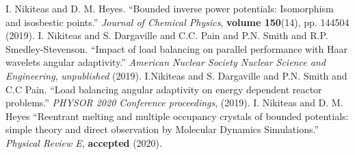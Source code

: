 \begingroup
\renewcommand{\section}[2]{}%
\begin{thebibliography}{}%
    I. Nikiteas and D. M. Heyes.
    ``Bounded inverse power potentials: Isomorphism and isosbestic points.''\newline
    \textit{Journal of Chemical Physics}, \textbf{volume 150}(14), pp. 144504 (2019).
    \newline \newline
    I. Nikiteas and S. Dargaville and C.C. Pain and P.N. Smith and R.P. Smedley-Stevenson.
    ``Impact of load balancing on parallel performance with Haar wavelets angular adaptivity.''
    \textit{American Nuclear Society Nuclear Science and Engineering}, \textit{unpublished} (2019).
    \newline \newline
    I.Nikiteas and S. Dargaville and P.N. Smith and C.C Pain.
    ``Load balancing angular adaptivity on energy dependent reactor problems.''
    \textit{PHYSOR 2020 Conference proceedings}, (2019).
    \newline \newline
    I. Nikiteas and D. M. Heyes
    ``Reentrant melting and multiple occupancy crystals of bounded
    potentials: simple theory and direct observation by Molecular
    Dynamics Simulations.'' \textit{Physical Review E}, \textbf{accepted} (2020).
\end{thebibliography}
%
%


